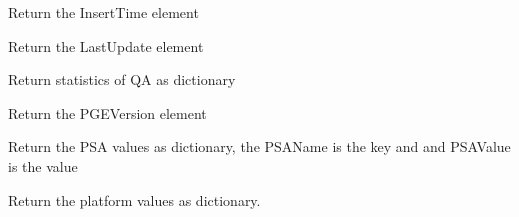 \documentclass[a4paper,11pt,oneside]{sphinxmanual}
\begin{document}
\begin{fulllineitems}
\begin{fulllineitems}
\end{fulllineitems}


\begin{fulllineitems}
\label{pymodis/pymodis:pymodis.parsemodis.parseModis.retInsertTime}
Return the InsertTime element

\end{fulllineitems}


\begin{fulllineitems}
\label{pymodis/pymodis:pymodis.parsemodis.parseModis.retLastUpdate}
Return the LastUpdate element

\end{fulllineitems}


\begin{fulllineitems}
\label{pymodis/pymodis:pymodis.parsemodis.parseModis.retMeasure}
Return statistics of QA as dictionary

\end{fulllineitems}


\begin{fulllineitems}
\label{pymodis/pymodis:pymodis.parsemodis.parseModis.retPGEVersion}
Return the PGEVersion element

\end{fulllineitems}


\begin{fulllineitems}
\label{pymodis/pymodis:pymodis.parsemodis.parseModis.retPSA}
Return the PSA values as dictionary, the PSAName is the key and
and PSAValue is the value

\end{fulllineitems}


\begin{fulllineitems}
\label{pymodis/pymodis:pymodis.parsemodis.parseModis.retPlatform}
Return the platform values as dictionary.


\end{fulllineitems}
\end{fulllineitems}
\end{document}
